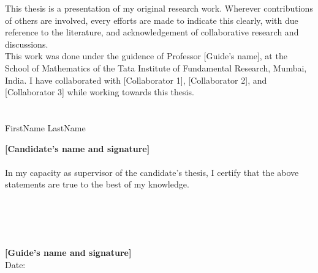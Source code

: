 \documentclass[11pt,english,
onehalfspacing,
headsepline]{thesis}
\numberwithin{equation}{subsection}
\theoremstyle{definition}
\begin{document}

\begin{declaration}

\noindent
This thesis is a presentation of my original research work. Wherever contributions of others 
are involved, every efforts are made to indicate this clearly, with due reference to the 
literature, and acknowledgement of collaborative research and discussions.  \\ 

\noindent 
This work was done under the guidence of Professor [Guide's name], at the School of Mathematics 
of the Tata Institute of Fundamental Research, Mumbai, India. I have collaborated with [Collaborator 1], 
[Collaborator 2], and [Collaborator 3] while working towards this thesis. \\ \\ \\  


\hfill{FirstName LastName \hspace*{60px}} 

\hfill{\textbf{[Candidate's name and signature]}} \\ \\

\noindent
In my capacity as supervisor of the candidate's thesis, I certify that the above statements 
are true to the best of my knowledge. \\ \\ \\ \\ \\


\noindent
\hspace*{10px}\supname %

\noindent
\textbf{[Guide's name and signature]} \\ 

\noindent 
Date: 

\end{declaration}

\end{document}
